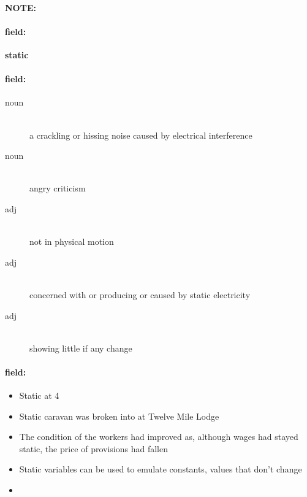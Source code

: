 \documentclass[12pt]{article}
\newenvironment{note}{\paragraph{NOTE:}}{}
\newenvironment{field}{\paragraph{field:}}{}
\begin{document}
\begin{note}
\begin{field}
\textbf{\large static}
\end{field}


\begin{field}
\begin{description}
\item[noun] \hfill \\ 
a crackling or hissing noise caused by electrical interference

\item[noun] \hfill \\ 
angry criticism

\item[adj] \hfill \\ 
not in physical motion

\item[adj] \hfill \\ 
concerned with or producing or caused by static electricity

\item[adj] \hfill \\ 
showing little if any change

\end{description}
\end{field}

\begin{field}
\begin{itemize}
\item Static at 4
\item Static caravan was broken into at Twelve Mile Lodge
\item The condition of the workers had improved as, although wages had stayed static, the price of provisions had fallen
\item Static variables can be used to emulate constants, values that don't change
\item 
\end{itemize}
\end{field}
\end{note}
\end{document}

